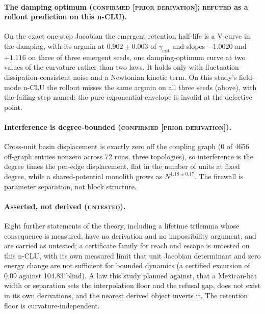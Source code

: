 \documentclass{article} %
\begin{document}
\paragraph{The damping optimum (\textsc{confirmed [prior derivation]}; \textsc{refuted} as a
rollout prediction on this n-CLU).} On the exact one-step Jacobian the emergent retention
half-life is a V-curve in the damping, with its argmin at $0.902\pm0.003$ of
$\gamma_{\text{crit}}$ and slopes $-1.0020$ and $+1.116$ on three of three emergent seeds, one
damping-optimum curve at two values of the curvature rather than two laws.
It holds only with fluctuation--dissipation-consistent noise and a Newtonian kinetic term. On
this study's field-mode n-CLU the rollout misses the same argmin on all three seeds (above), with the
failing step named: the pure-exponential envelope is invalid at the defective point.

\paragraph{Interference is degree-bounded (\textsc{confirmed [prior derivation]}).} Cross-unit
basin displacement is exactly zero off the coupling graph (0 of 4656 off-graph entries nonzero
across 72 runs, three topologies), so interference is the degree times the per-edge displacement,
flat in the number of units at fixed degree, while a shared-potential monolith grows as
$N^{1.18\pm0.17}$. The firewall is parameter separation, not block structure.

\paragraph{Asserted, not derived (\textsc{untested}).} Eight further statements of the theory,
including a lifetime trilemma whose consequence is measured, have no derivation and no
impossibility argument, and are carried as untested; a certificate family for reach and escape is
untested on this n-CLU, with its own measured limit that unit Jacobian determinant and zero
energy change are not sufficient for bounded dynamics (a certified excursion of 0.09 against
104.83 blind). %
A law this study planned against, that a Mexican-hat width or separation sets the
interpolation floor and the refusal gap, does not exist in its own derivations, and the nearest
derived object inverts it. The retention floor is curvature-independent. %
\end{document}
